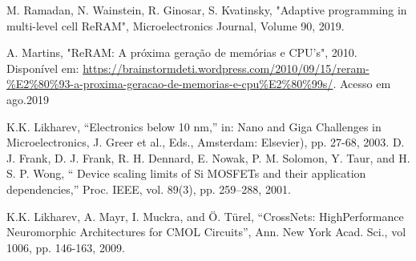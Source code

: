 \documentclass{ceel}
\begin{document}
\begin{multicols}{2}
\begin{thebibliography}{9}
    M. Ramadan, N. Wainstein, R. Ginosar, S. Kvatinsky, "Adaptive programming in multi-level cell ReRAM", Microelectronics Journal, Volume 90, 2019. %
    
A. Martins, "ReRAM: A próxima geração de memórias e CPU's", 2010. Disponível em: \url{https://brainstormdeti.wordpress.com/2010/09/15/reram-\%E2\%80\%93-a-proxima-geracao-de-memorias-e-cpu\%E2\%80\%99s/}. Acesso em ago.2019

K.K. Likharev, “Electronics below 10 nm,” in: Nano and Giga Challenges in Microelectronics, J. Greer et al., Eds., Amsterdam: Elsevier), pp. 27-68, 2003.
D. J. Frank, D. J. Frank, R. H. Dennard, E. Nowak, P. M. Solomon, Y. Taur, and H. S. P. Wong, “ Device scaling limits of Si MOSFETs and their application dependencies,” Proc. IEEE, vol. 89(3), pp. 259–288, 2001.


K.K. Likharev, A. Mayr, I. Muckra, and Ö. Türel, “CrossNets: HighPerformance Neuromorphic Architectures for CMOL Circuits”, Ann. New York Acad. Sci., vol 1006, pp. 146-163, 2009.

\end{thebibliography}

\end{multicols}
\end{document}
